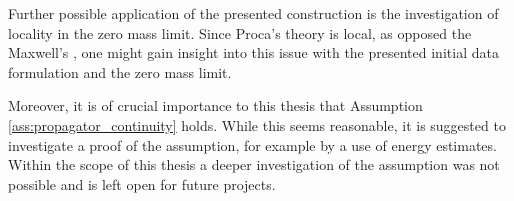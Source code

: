 Further possible application of the presented construction is the investigation of locality in the zero mass limit. Since Proca's theory is local, as opposed the Maxwell's \cite{Dappiaggi2012,Sanders}, one might gain insight into this issue with the presented initial data formulation and the zero mass limit.\par
Moreover, it is of crucial importance to this thesis that Assumption \ref{ass:propagator_continuity} holds. While this seems reasonable, it is suggested to investigate a proof of the assumption, for example by a use of energy estimates. Within the scope of this thesis a deeper investigation of the assumption was not possible and is left open for future projects.
